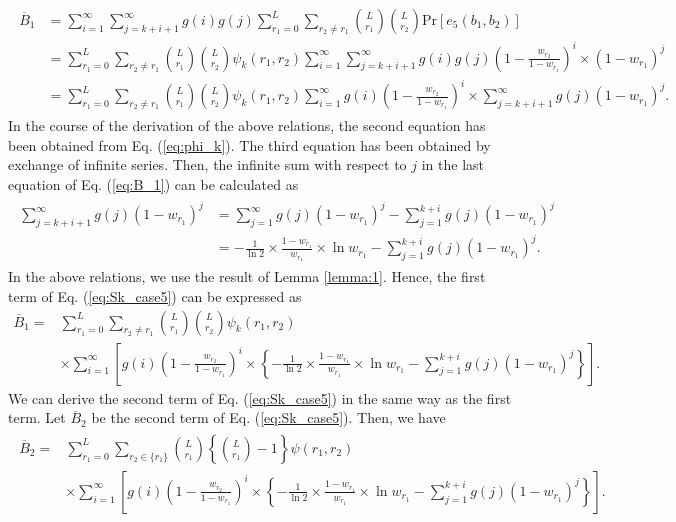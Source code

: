 \begin{align}\begin{split}\label{eq:B_1}
  \overline{B}_1
  &=\sum_{i=1}^{\infty}\sum_{j=k+i+1}^{\infty} g(i)g(j) \sum_{r_1=0}^{L} \sum_{r_2 \neq r_1} \binom{L}{r_1}\binom{L}{r_2}\mathrm{Pr}[e_5(b_1,b_2)] \\
  &=\sum_{r_1=0}^{L} \sum_{r_2 \neq r_1} \binom{L}{r_1}\binom{L}{r_2}\psi_k(r_1,r_2)
  \sum_{i=1}^{\infty} \sum_{j=k+i+1}^{\infty} g(i)g(j) \left(1-\frac{w_{r_2}}{1-w_{r_1}} \right)^{i} \times (1-w_{r_1})^j \\
  &=\sum_{r_1=0}^{L} \sum_{r_2 \neq r_1} \binom{L}{r_1}\binom{L}{r_2}\psi_k(r_1,r_2)
  \sum_{i=1}^{\infty} g(i)\left(1-\frac{w_{r_2}}{1-w_{r_1}} \right)^{i} \times \sum_{j=k+i+1}^{\infty} g(j) (1-w_{r_1})^j.
\end{split}\end{align}
In the course of the derivation of the above relations, the second equation has been obtained from Eq. (\ref{eq:phi_k}). The third equation has been obtained by exchange of infinite series.
%
Then, the infinite sum with respect to $j$ in the last equation of Eq. (\ref{eq:B_1}) can be calculated as
\begin{align}\begin{split}
  \sum_{j=k+i+1}^{\infty} g(j) (1-w_{r_1})^j 
  &= \sum_{j=1}^{\infty} g(j)(1-w_{r_1})^{j} - \sum_{j=1}^{k+i} g(j)(1-w_{r_1})^{j} \\
  &= -\frac{1}{\ln 2} \times \frac{1-w_{r_1}}{w_{r_1}} \times \ln w_{r_1} - \sum_{j=1}^{k+i} g(j)(1-w_{r_1})^{j}.
\end{split}\end{align}
In the above relations, we use the result of Lemma \ref{lemma:1}.
Hence, the first term of Eq. (\ref{eq:Sk_case5}) can be expressed as
\begin{align}
  \overline{B}_1 
  =& \sum_{r_1=0}^{L} \sum_{r_2 \neq r_1} \binom{L}{r_1}\binom{L}{r_2}\psi_k(r_1,r_2)\\
  &\times\sum_{i=1}^{\infty} \left[ g(i) \left(1-\frac{w_{r_2}}{1-w_{r_1}} \right)^{i} \times \left\{ -\frac{1}{\ln 2} \times \frac{1-w_{r_1}}{w_{r_1}} \times \ln w_{r_1} - \sum_{j=1}^{k+i} g(j)(1-w_{r_1})^{j} \right\} \right].
\end{align}
We can derive the second term of Eq. (\ref{eq:Sk_case5}) in the same way as the first term. Let $\overline{B}_2$ be the second term of Eq. (\ref{eq:Sk_case5}). Then, we have
\begin{align}\begin{split}
  \overline{B}_2 =& \sum_{r_1=0}^{L} \sum_{r_2 \in \{r_1\}} \binom{L}{r_1}\left\{\binom{L}{r_1}-1\right\} \psi(r_1,r_2) \\
  &\times\sum_{i=1}^{\infty} \left[ g(i) \left(1-\frac{w_{r_2}}{1-w_{r_1}} \right)^{i} \times \left\{ -\frac{1}{\ln 2} \times \frac{1-w_{r_1}}{w_{r_1}} \times \ln w_{r_1} - \sum_{j=1}^{k+i} g(j)(1-w_{r_1})^{j} \right\} \right].
\end{split}\end{align}
